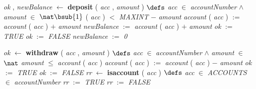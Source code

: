 \bresetindent
%
%
\vspace{-4.5ex}\bsetindent
\begin{tabbing}
\bSetTabs
\+\>
%
%
{\em ok\/} , {\em newBalance\/} $\longleftarrow$  {\bf { deposit}} ( {\em acc\/} , {\em amount\/} ) \bhsp $\defs$ \+ \bnl
  \+\bnl
{\em acc\/} $\in$ {\em accountNumber\/} $\wedge$ \bnl
{\em amount\/} $\in$  $\nat\bsub{1}$  \-\bnl
{} \+\bnl
{}  ( {\em acc\/} )  $<$ {\em MAXINT\/}\label{MAXINT}  $-$ {\em amount\/} \- \bhsp {} \+\bnl
{\em account\/} ( {\em acc\/} )  $:=$  {\em account\/} ( {\em acc\/} )  $+$ {\em amount\/} \bparallel \bnl
{\em newBalance\/} $:=$  {\em account\/} ( {\em acc\/} )  $+$ {\em amount\/} \bparallel \bnl
{\em ok\/} $:=$  {\em TRUE\/} \-\bnl
{} \+\bnl
{\em ok\/} $:=$  {\em FALSE\/} \bparallel \bnl
{\em newBalance\/} $:=$  {\em 0\/} \-\bnl
{}  \-\bnl
{}  \- \bOperationSemiColon 
\end{tabbing}
\bresetindent
%
%
\vspace{-4.5ex}\bsetindent
\begin{tabbing}
\bSetTabs
\+\>
%
%
{\em ok\/} $\longleftarrow$  {\bf { withdraw}} ( {\em acc\/} , {\em amount\/} ) \bhsp $\defs$ \+ \bnl
  \+\bnl
{\em acc\/} $\in$ {\em accountNumber\/} $\wedge$ \bnl
{\em amount\/} $\in$  $\nat$  \-\bnl
{} \+\bnl
{} \+\bnl
{\em amount\/} $\leq$ {\em account\/} ( {\em acc\/} )  \-\bnl
{} \+\bnl
{\em account\/} ( {\em acc\/} )  $:=$  {\em account\/} ( {\em acc\/} )  $-$ {\em amount\/} \bparallel \bnl
{\em ok\/} $:=$  {\em TRUE\/} \-\bnl
{} \+\bnl
{\em ok\/} $:=$  {\em FALSE\/} \-\bnl
{}  \-\bnl
{}  \- \bOperationSemiColon \bbnl
%
%
{\em rr\/} $\longleftarrow$  {\bf { isaccount}} ( {\em acc\/} ) \bhsp $\defs$ \+ \bnl
  \+\bnl
{\em acc\/} $\in$ {\em ACCOUNTS\/}\label{ACCOUNTS}  \-\bnl
{} \+\bnl
{}  $\in$ {\em accountNumber\/} \-\bnl
{} \+\bnl
{\em rr\/} $:=$  {\em TRUE\/} \-\bnl
{} \+\bnl
{\em rr\/} $:=$  {\em FALSE\/} \-\bnl
{}  \-\bnl
{}  \- \bOperationSemiColon 
\end{tabbing}
